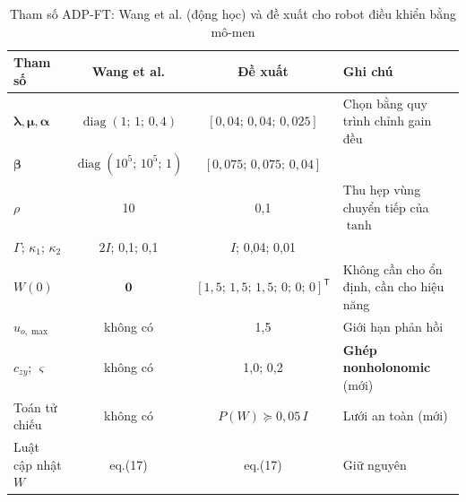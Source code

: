 \documentclass[12pt,a4paper]{article}
\newcommand{\T}{\mathsf{T}}
\DeclareMathOperator{\diag}{diag}
\begin{document}
\begin{table}[H]
\centering
\caption{Tham số ADP-FT: Wang et al. (động học) và đề xuất cho robot điều khiển bằng mô-men}
\small
\begin{tabular}{lcc>{\raggedright\arraybackslash}p{4.6cm}}
\toprule
\textbf{Tham số} & \textbf{Wang et al.} & \textbf{Đề xuất} & \textbf{Ghi chú} \\
\midrule
$\bm\lambda, \bm\mu, \bm\alpha$ & $\diag(1;\,1;\,0{,}4)$ & $[0{,}04;\, 0{,}04;\, 0{,}025]$ & Chọn bằng quy trình chỉnh gain đều \\
$\bm\beta$ & $\diag(10^5;\,10^5;\,1)$ & $[0{,}075;\, 0{,}075;\, 0{,}04]$ & \\
$\rho$ & 10 & 0,1 & Thu hẹp vùng chuyển tiếp của $\tanh$ \\
$\Gamma$; $\kappa_1$; $\kappa_2$ & $2I$; 0,1; 0,1 & $I$; 0,04; 0,01 & \\
$W(0)$ & $\bm 0$ & $[1{,}5;\,1{,}5;\,1{,}5;\,0;\,0;\,0]^\T$ & Không cần cho ổn định, cần cho hiệu năng \\
$u_{o,\max}$ & không có & 1,5 & Giới hạn phản hồi \\
$c_{zy}$; $\varsigma$ & không có & 1,0; 0,2 & \textbf{Ghép nonholonomic} (mới) \\
Toán tử chiếu & không có & $P(W) \succeq 0{,}05\,I$ & Lưới an toàn (mới) \\
Luật cập nhật $W$ & eq.(17) & eq.(17) & Giữ nguyên \\
\bottomrule
\end{tabular}
\end{table}
\end{document}
